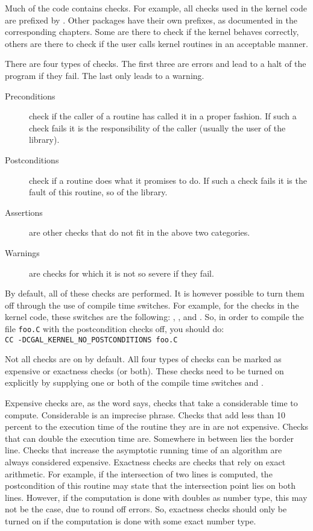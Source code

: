 


Much of the {\cgal} code contains checks. 
For example, all checks used in the kernel code are prefixed by 
.
Other packages have their own prefixes, as documented in the corresponding
chapters.
Some are there to check if the kernel behaves correctly, others are there to 
check if the user calls kernel routines in an acceptable manner.

There are four types of checks. 
The first three are errors and lead to a halt of the program if they fail. 
The last only leads to a warning.
\begin{description}
\item[Preconditions] check if the caller of a routine has called it in a
proper fashion. 
If such a check fails it is the responsibility of the caller 
(usually the user of the library).
\item[Postconditions] check if a routine does what it promises to do. 
If such a check fails it is the fault of this routine, so of the library.
\item[Assertions] are other checks that do not fit in the above two 
categories.
\item[Warnings] are checks for which it is not so severe if they fail.
\end{description}

By default, all of these checks are performed. 
It is however possible to turn them off through the use of compile time 
switches.
For example, for the checks in the kernel code, these switches are the 
following:
, 
,
 and 
.
So, in order to compile the file \verb~foo.C~ with the postcondition checks
off, you should do:\\
\verb~CC -DCGAL_KERNEL_NO_POSTCONDITIONS foo.C~

Not all checks are on by default.
All four types of checks can be marked as expensive or exactness checks
(or both).
These checks need to be turned on explicitly by supplying one or both of
the compile time switches  and 
.

Expensive checks are, as the word says, checks that take a considerable
time to compute. 
Considerable is an imprecise phrase. 
Checks that add less than 10 percent to the execution time of the routine 
they are in are not expensive.
Checks that can double the execution time are. 
Somewhere in between lies the border line.
Checks that increase the asymptotic running time of an algorithm are always 
considered expensive.
Exactness checks are checks that rely on exact arithmetic. 
For example, if the intersection of two lines is computed, the postcondition 
of this routine may state that the intersection point lies on both lines. 
However, if the computation is done with doubles as number type, this may not 
be the case, due to round off errors. 
So, exactness checks should only be turned on if the computation is done 
with some exact number type.

